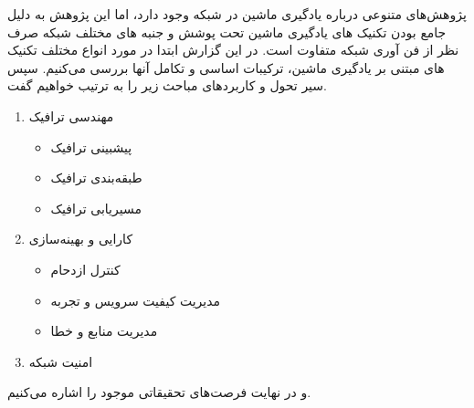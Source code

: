 پژوهش‌های متنوعی درباره یادگیری ماشین در شبکه
وجود دارد، اما این پژوهش به دلیل جامع بودن تکنیک های یادگیری ماشین تحت پوشش و جنبه های مختلف شبکه صرف نظر از فن آوری شبکه متفاوت است. در این گزارش ابتدا در مورد انواع مختلف تکنیک های مبتنی بر یادگیری ماشین، ترکیبات اساسی و تکامل آنها بررسی می‌کنیم. سپس سیر تحول و کاربردهای مباحث زیر را به ترتیب خواهیم گفت.
\begin{enumerate}
    \item مهندسی ترافیک
    \begin{itemize}
        \item پیشبینی ترافیک
        \item طبقه‌بندی ترافیک
        \item مسیریابی ترافیک
    \end{itemize}
    \item کارایی و بهینه‌سازی
    \begin{itemize}
        \item کنترل ازدحام
        \item مدیریت کیفیت سرویس و تجربه
        \item مدیریت منابع و خطا
    \end{itemize}
    \item امنیت شبکه
\end{enumerate}
و در نهایت فرصت‌های تحقیقاتی موجود را اشاره می‌کنیم.


